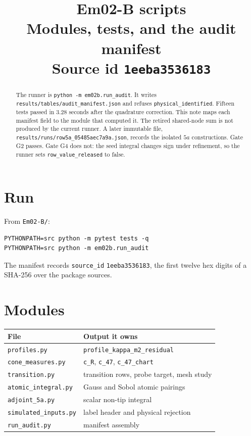 \documentclass[11pt,letterpaper]{article}
\title{\textbf{Em02-B scripts}\\[0.4em]
Modules, tests, and the audit manifest\\[0.4em]
\large Source id \texttt{1eeba3536183}}
\author{}
\date{}
\begin{document}
\maketitle

\begin{abstract}
The runner is \texttt{python -m em02b.run\_audit}.
It writes \texttt{results/tables/audit\_manifest.json}
and refuses \texttt{physical\_identified}.
Fifteen tests passed in \(3.28\) seconds after the quadrature
correction.
This note maps each manifest field to the module that computed it.
The retired shared-node sum is not produced by the current runner.
A later immutable file, \texttt{results/runs/row5a\_05485aec7a9a.json},
records the isolated \(5a\) constructions. Gate G2 passes.
Gate G4 does not: the seed integral changes sign under refinement,
so the runner sets \texttt{row\_value\_released} to false.
\end{abstract}

\tableofcontents

\section{Run}
From \texttt{Em02-B/}:
\begin{verbatim}
PYTHONPATH=src python -m pytest tests -q
PYTHONPATH=src python -m em02b.run_audit
\end{verbatim}
The manifest records \texttt{source\_id}
\texttt{1eeba3536183}, the first twelve hex digits of a SHA-256
over the package sources.

\section{Modules}
\begin{center}
\small
\begin{tabularx}{\linewidth}{@{}p{.30\linewidth}Y@{}}
\toprule
File & Output it owns\\
\midrule
\texttt{profiles.py} &
\texttt{profile\_kappa\_m2\_residual}\\[0.2em]
\texttt{cone\_measures.py} &
\texttt{c\_R}, \texttt{c\_47}, \texttt{c\_47\_chart}\\[0.2em]
\texttt{transition.py} &
transition rows, probe target, mesh study\\[0.2em]
\texttt{atomic\_integral.py} &
Gauss and Sobol atomic pairings\\[0.2em]
\texttt{adjoint\_5a.py} &
scalar non-tip integral\\[0.2em]
\texttt{simulated\_inputs.py} &
label header and physical rejection\\[0.2em]
\texttt{run\_audit.py} &
manifest assembly\\
\bottomrule
\end{tabularx}
\end{center}
\end{document}
